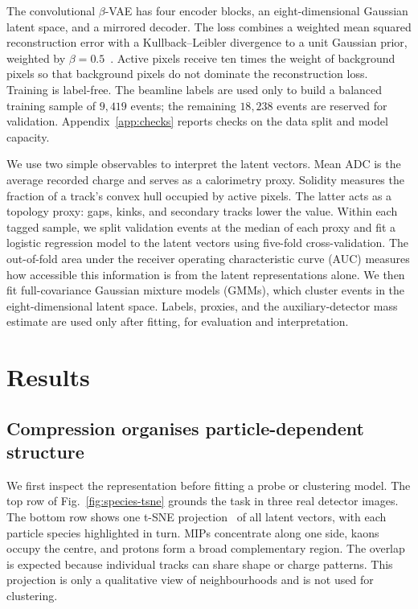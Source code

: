 \documentclass{article}
\begin{document}
The convolutional $\beta$-VAE has four encoder blocks, an eight-dimensional Gaussian latent space, and a mirrored decoder. The loss combines a weighted mean squared reconstruction error with a Kullback--Leibler divergence to a unit Gaussian prior, weighted by $\beta=0.5$~\cite{Higgins2017}. Active pixels receive ten times the weight of background pixels so that background pixels do not dominate the reconstruction loss. Training is label-free. The beamline labels are used only to build a balanced training sample of $9{,}419$ events; the remaining $18{,}238$ events are reserved for validation. Appendix~\ref{app:checks} reports checks on the data split and model capacity.

We use two simple observables to interpret the latent vectors. Mean ADC is the average recorded charge and serves as a calorimetry proxy. Solidity measures the fraction of a track's convex hull occupied by active pixels. The latter acts as a topology proxy: gaps, kinks, and secondary tracks lower the value. Within each tagged sample, we split validation events at the median of each proxy and fit a logistic regression model to the latent vectors using five-fold cross-validation. The out-of-fold area under the receiver operating characteristic curve (AUC) measures how accessible this information is from the latent representations alone. We then fit full-covariance Gaussian mixture models (GMMs), which cluster events in the eight-dimensional latent space. Labels, proxies, and the auxiliary-detector mass estimate are used only after fitting, for evaluation and interpretation.

\section{Results}
\label{sec:results}

\subsection{Compression organises particle-dependent structure}
\label{sec:representation}

We first inspect the representation before fitting a probe or clustering model. The top row of Fig.~\ref{fig:species-tsne} grounds the task in three real detector images. The bottom row shows one t-SNE projection~\cite{Maaten2008} of all latent vectors, with each particle species highlighted in turn. MIPs concentrate along one side, kaons occupy the centre, and protons form a broad complementary region. The overlap is expected because individual tracks can share shape or charge patterns. This projection is only a qualitative view of neighbourhoods and is not used for clustering. 
\end{document}
